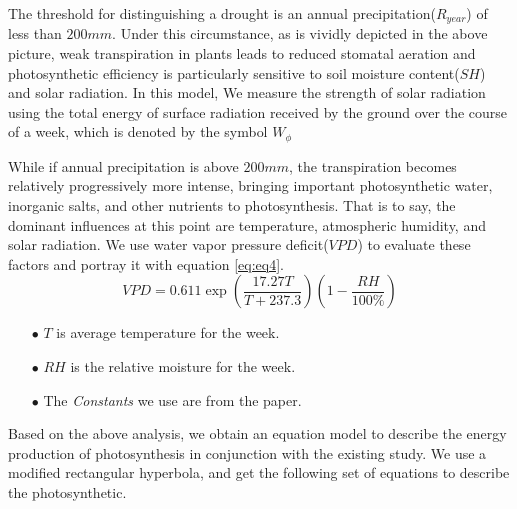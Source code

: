 \documentclass[12pt]{article}  %
\newenvironment{shrinkeq}[1]
{ \bgroup
	\addtolength\abovedisplayshortskip{#1}
	\addtolength\abovedisplayskip{#1}
	\addtolength\belowdisplayshortskip{#1}
	\addtolength\belowdisplayskip{#1}}
{\egroup\ignorespacesafterend}
\begin{document}
\vspace{-0.6cm}
The threshold for distinguishing a drought is an annual precipitation($R_{year}$) of less than $200mm$. Under this circumstance, as is vividly depicted in the above picture, weak transpiration in plants leads to reduced stomatal aeration and photosynthetic efficiency is particularly sensitive to soil moisture content($SH$) and solar radiation.  In this model, We measure the strength of solar radiation using the total energy of surface radiation received by the ground over the course of a week, which is denoted by the symbol $W_\phi$ 

While if annual precipitation is above $200mm$, the transpiration becomes relatively progressively more intense, bringing important photosynthetic water, inorganic salts, and other nutrients to photosynthesis. That is to say,  the dominant influences at this point are temperature, atmospheric humidity, and solar radiation. We use water vapor pressure deficit($VPD$) to evaluate these factors and portray it with equation \eqref{eq:eq4}.
\begin{shrinkeq}{-1ex}
	\begin{equation}
    \label{eq:eq4}
	   VPD=0.611 \exp(\frac{17.27 T}{T+237.3})(1-\frac{RH}{100\%})
	\end{equation}
\end{shrinkeq}

\begin{itemize}
\vspace{-0.4cm}
\item[$\bullet$] \textbf{$T$ }is average temperature for the week.
\vspace{-0.2cm}
\item[$\bullet$] \textbf{$RH$ }is the relative moisture for the week.
\vspace{-0.2cm}
\item[$\bullet$] The \textit{Constants} we use are from the paper{\cite{6}}.
\end{itemize}

\vspace{-0.2cm}
Based on the above analysis, we obtain an equation model to describe the energy production of photosynthesis in conjunction with the existing study{\cite{5}}. We use a modified rectangular hyperbola, and get the following set of equations to describe the photosynthetic.
\end{document}
